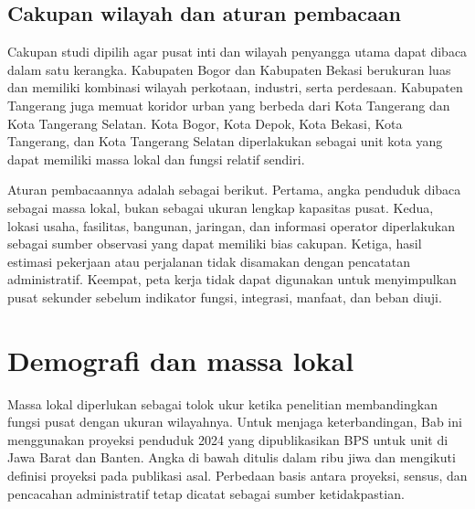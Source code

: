 \documentclass[11pt,a4paper,oneside,openany,indonesian]{report}
\begin{document}
\subsection{Cakupan wilayah dan aturan pembacaan}

Cakupan studi dipilih agar pusat inti dan wilayah penyangga utama dapat dibaca dalam satu kerangka. Kabupaten Bogor dan Kabupaten Bekasi berukuran luas dan memiliki kombinasi wilayah perkotaan, industri, serta perdesaan. Kabupaten Tangerang juga memuat koridor urban yang berbeda dari Kota Tangerang dan Kota Tangerang Selatan. Kota Bogor, Kota Depok, Kota Bekasi, Kota Tangerang, dan Kota Tangerang Selatan diperlakukan sebagai unit kota yang dapat memiliki massa lokal dan fungsi relatif sendiri.

Aturan pembacaannya adalah sebagai berikut. Pertama, angka penduduk dibaca sebagai massa lokal, bukan sebagai ukuran lengkap kapasitas pusat. Kedua, lokasi usaha, fasilitas, bangunan, jaringan, dan informasi operator diperlakukan sebagai sumber observasi yang dapat memiliki bias cakupan. Ketiga, hasil estimasi pekerjaan atau perjalanan tidak disamakan dengan pencatatan administratif. Keempat, peta kerja tidak dapat digunakan untuk menyimpulkan pusat sekunder sebelum indikator fungsi, integrasi, manfaat, dan beban diuji.

\section{Demografi dan massa lokal}

Massa lokal diperlukan sebagai tolok ukur ketika penelitian membandingkan fungsi pusat dengan ukuran wilayahnya. Untuk menjaga keterbandingan, Bab ini menggunakan proyeksi penduduk 2024 yang dipublikasikan BPS untuk unit di Jawa Barat dan Banten. Angka di bawah ditulis dalam ribu jiwa dan mengikuti definisi proyeksi pada publikasi asal. Perbedaan basis antara proyeksi, sensus, dan pencacahan administratif tetap dicatat sebagai sumber ketidakpastian.
\end{document}
